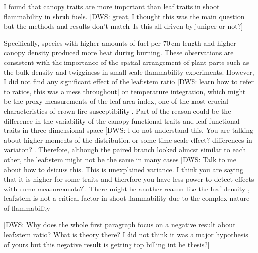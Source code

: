 \documentclass[12pt]{report}
\begin{document}
I found that canopy traits are more important than leaf traits in shoot flammability in shrub fuels. [DWS: great, I thought this was the main question but the methods and results don't match. Is this all driven by juniper or not?]

Specifically, species with higher amounts of fuel per 70\,cm length and higher canopy density produced more heat during burning. These observations are consistent with the importance of the spatial arrangement of plant parts such as the bulk density \citep{pausas2012fire} and twigginess \citep{potts2022growth} in small-scale flammability experiments. However, I did not find any significant effect of the leaf:stem ratio [DWS: learn how to refer to ratios, this was a mess throughout] on temperature integration, which might be the proxy measurements of the leaf area index, one of the most crucial characteristics of crown fire susceptibility \citep{ray2005micrometeorological}. Part of the reason could be the difference in the variability of the canopy functional traits and leaf functional traits in three-dimensional space \citep{kamoske2021leaf} [DWS: I do not understand this. You are talking about higher moments of the distribution or some time-scale effect? differences in variaton?]. Therefore, although the paired branch looked almost similar to each other, the leaf:stem might not be the same in many cases  [DWS: Talk to me about how to dsicuss this. This is unexplained variance. I think you are saying that it is higher for some traits and therefore you have less power to detect effects with some measurements?]. There might be another reason like the leaf density \citep{potts2022growth}, leaf:stem is not a critical factor in shoot flammability due to the complex nature of flammability

[DWS: Why does the whole first paragraph focus on a negative result about leaf:stem ratio? What is theory there? I did not think it was a major hypothesis of yours but this negative result is getting top billing int he thesis?]
\end{document}
